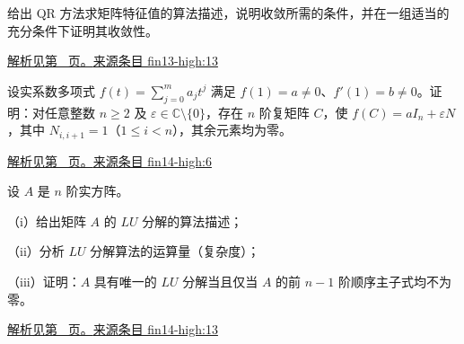 \documentclass[UTF8,12pt,a4paper,fontset=fandol]{ctexart}
\begin{document}
\begin{example}\label{ex:fin13-high:13}

给出 QR 方法求矩阵特征值的算法描述，说明收敛所需的条件，并在一组适当的充分条件下证明其收敛性。

\par\hyperref[ans:fin13-high:13]{解析见第~\pageref{ans:fin13-high:13} 页。}\quad\href{https://github.com/lzxcr/cmc-mathematics/blob/64916fa1fdbc3e444a652eca204d5669058ee321/src/problems/finals/13/16.md}{来源条目 fin13-high:13}

\end{example}

\begin{example}\label{ex:fin14-high:6}

设实系数多项式 $f(t)=\sum_{j=0}^ma_jt^j$ 满足 $f(1)=a\ne0$、$f'(1)=b\ne0$。证明：对任意整数 $n\ge2$ 及 $\varepsilon\in\mathbb C\setminus\{0\}$，存在 $n$ 阶复矩阵 $C$，使 $f(C)=aI_n+\varepsilon N$，其中 $N_{i,i+1}=1$（$1\le i<n$），其余元素均为零。

\par\hyperref[ans:fin14-high:6]{解析见第~\pageref{ans:fin14-high:6} 页。}\quad\href{https://github.com/lzxcr/cmc-mathematics/blob/64916fa1fdbc3e444a652eca204d5669058ee321/src/problems/finals/14/06.md}{来源条目 fin14-high:6}

\end{example}

\begin{example}\label{ex:fin14-high:13}

设 $A$ 是 $n$ 阶实方阵。

（i）给出矩阵 $A$ 的 $LU$ 分解的算法描述；

（ii）分析 $LU$ 分解算法的运算量（复杂度）；

（iii）证明：$A$ 具有唯一的 $LU$ 分解当且仅当 $A$ 的前 $n-1$ 阶顺序主子式均不为零。

\par\hyperref[ans:fin14-high:13]{解析见第~\pageref{ans:fin14-high:13} 页。}\quad\href{https://github.com/lzxcr/cmc-mathematics/blob/64916fa1fdbc3e444a652eca204d5669058ee321/src/problems/finals/14/16.md}{来源条目 fin14-high:13}

\end{example}
\end{document}
